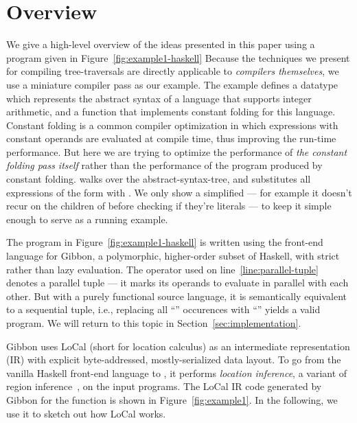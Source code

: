 \documentclass[acmsmall,acmthm=false,nonacm]{acmart}
\theoremstyle{straighttext0}
\theoremstyle{straighttext}
\newcommand{\Secref}[1]{Section~\ref{#1}}
\newcommand{\Figref}[1]{Figure~\ref{#1}}
\begin{document}
\section{Overview}
\label{sec:overview}

We give a high-level overview of the ideas presented in this paper
using a program given in \Figref{fig:example1-haskell}
%
\iftoggle{EXTND}{
  (with a larger sample program given in Appendix \ref{sec:appendix-code-snippet}).
}{
  (with a larger sample program given in the Appendix of the extended version~\cite{ParallelLoCal-tr}).
}
%
Because the techniques we present for compiling tree-traversals are
directly applicable to {\em compilers themselves}, we use 
a miniature compiler pass as our example.
%
The example defines a datatype  which represents the abstract syntax of a language that supports
integer arithmetic, and a function  that implements
constant folding for this language.
%
Constant folding is a common compiler optimization in which expressions with
constant operands are evaluated at compile time, thus improving the run-time performance.
%
But here we are trying to optimize the performance of {\em the constant folding pass itself}
rather than the performance of the program produced by constant folding.
%
 walks over the abstract-syntax-tree, and substitutes all
expressions of the form  with .
%
We only show a simplified  ---
for example it doesn't recur on the children of  before checking if they're literals ---
to keep it simple enough to serve as a running example.

The program in \Figref{fig:example1-haskell} is written using the
front-end language for Gibbon, a polymorphic, higher-order subset of Haskell,
with strict rather than lazy evaluation.
%
The \il{($\partup$)} operator used on line~\ref{line:parallel-tuple} denotes a parallel tuple --- it marks its operands to evaluate in parallel with each other.
%
But with a purely functional source language, it is semantically equivalent to a sequential
tuple, i.e., replacing all ``\il{$\partup$}'' occurences with ``\il{,}'' yields a valid program.
%
We will return to this topic in \Secref{sec:implementation}.


Gibbon uses LoCal (short for location calculus) as an intermediate
representation (IR) with explicit byte-addressed, mostly-serialized data layout.
%
To go from the vanilla Haskell front-end language to \seqcalc{},
it performs {\em location inference},
a variant of region inference~\cite{regioncalcs,mlkit-retrospective},
on the input programs.
%
%
The LoCal IR code generated by Gibbon for the  function
is shown in \Figref{fig:example1}.
%
In the following, we use it to sketch out how LoCal works.
\end{document}
